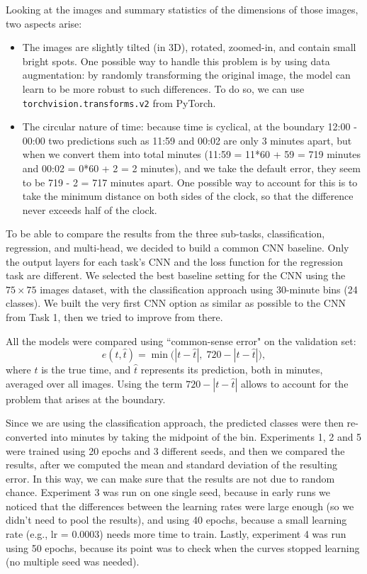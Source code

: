 \documentclass[a4paper]{article}
\begin{document}
Looking at the images and summary statistics of the dimensions of those images, two aspects arise:
\begin{itemize}
    \item The images are slightly tilted (in 3D), rotated, zoomed-in, and contain small bright spots. One possible way to handle this problem is by using data augmentation: by randomly transforming the original image, the model can learn to be more robust to such differences. To do so, we can use \texttt{torchvision.\allowbreak transforms.\allowbreak v2} from PyTorch.
    \item The circular nature of time: because time is cyclical, at the boundary 12:00 - 00:00 two predictions such as 11:59 and 00:02 are only 3 minutes apart, but when we convert them into total minutes (11:59 = 11*60 + 59 = 719 minutes and 00:02 = 0*60 + 2 = 2 minutes), and we take the default error, they seem to be 719 - 2 = 717 minutes apart. One possible way to account for this is to take the minimum distance on both sides of the clock, so that the difference never exceeds half of the clock.
\end{itemize}

To be able to compare the results from the three sub-tasks, classification, regression, and multi-head, we decided to build a common CNN baseline. Only the output layers for each task's CNN and the loss function for the regression task are different. We selected the best baseline setting for the CNN using the \(75\times75\) images dataset, with the classification approach using 30-minute bins (24 classes). We built the very first CNN option as similar as possible to the CNN from Task 1, then we tried to improve from there. 
 
All the models were compared using ``common-sense error" on the validation set:
\[
e(t, \hat t) = \min\big(|t-\hat t|,\; 720-|t-\hat t|\big),
\]
where \(t\) is the true time, and \(\hat t\) represents its prediction, both in minutes, averaged over all images. Using the term \(720-|t-\hat t|\) allows to account for the problem that arises at the boundary. 

Since we are using the classification approach, the predicted classes were then re-converted into minutes by taking the midpoint of the bin. Experiments 1, 2 and 5 were trained using 20 epochs and 3 different seeds, and then we compared the results, after we computed the mean and standard deviation of the resulting error. In this way, we can make sure that the results are not due to random chance. Experiment 3 was run on one single seed, because in early runs we noticed that the differences between the learning rates were large enough (so we didn't need to pool the results), and using 40 epochs, because a small learning rate (e.g., lr = 0.0003) needs more time to train. Lastly, experiment 4 was run using 50 epochs, because its point was to check when the curves stopped learning (no multiple seed was needed).
\end{document}
